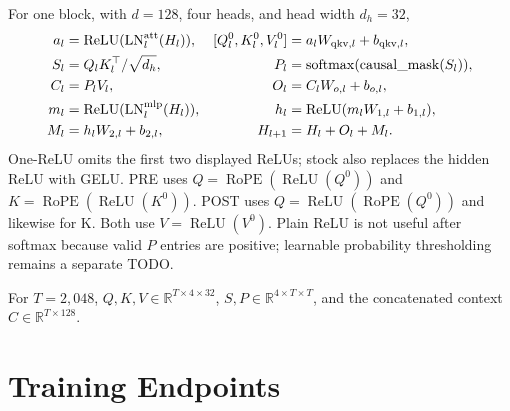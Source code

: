 \documentclass[10pt]{article}
\newcommand{\tightsection}[1]{\section{#1}\vspace{-0.35em}}
\begin{document}
For one block, with $d=128$, four heads, and head width $d_h=32$,
\begin{align*}
a_l &= \operatorname{ReLU}(\operatorname{LN}^{\rm att}_l(H_l)),
& [Q_l^0,K_l^0,V_l^0] &= a_lW_{{\rm qkv},l}+b_{{\rm qkv},l},\\
S_l &= Q_lK_l^\top/\sqrt{d_h},
& P_l &= \operatorname{softmax}(\operatorname{causal\_mask}(S_l)),\\
C_l &= P_lV_l,
& O_l &= C_lW_{o,l}+b_{o,l},\\
m_l &= \operatorname{ReLU}(\operatorname{LN}^{\rm mlp}_l(H_l)),
& h_l &= \operatorname{ReLU}(m_lW_{1,l}+b_{1,l}),\\
M_l &= h_lW_{2,l}+b_{2,l},
& H_{l+1} &= H_l+O_l+M_l.
\end{align*}
One-ReLU omits the first two displayed ReLUs; stock also replaces the hidden ReLU with GELU. PRE uses $Q=\operatorname{RoPE}(\operatorname{ReLU}(Q^0))$ and $K=\operatorname{RoPE}(\operatorname{ReLU}(K^0))$. POST uses $Q=\operatorname{ReLU}(\operatorname{RoPE}(Q^0))$ and likewise for K. Both use $V=\operatorname{ReLU}(V^0)$. Plain ReLU is not useful after softmax because valid $P$ entries are positive; learnable probability thresholding remains a separate TODO.

For $T=2{,}048$, $Q,K,V\in\mathbb{R}^{T\times4\times32}$, $S,P\in\mathbb{R}^{4\times T\times T}$, and the concatenated context $C\in\mathbb{R}^{T\times128}$.

\tightsection{Training Endpoints}
\end{document}
